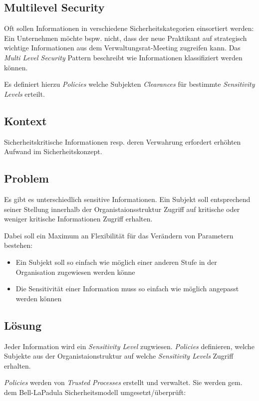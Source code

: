 \subsection{Multilevel Security}

Oft sollen Informationen in verschiedene Sicherheitskategorien einsortiert werden: Ein Unternehmen möchte bspw. nicht, dass der neue Praktikant auf strategisch wichtige Informationen aus dem Verwaltungsrat-Meeting zugreifen kann. Das \emph{Multi Level Security} Pattern beschreibt wie Informationen klassifiziert werden können.

Es definiert hierzu \emph{Policies} welche Subjekten \emph{Clearances} für bestimmte \emph{Sensitivity Levels} erteilt.


\subsection*{Kontext}
Sicherheitskritische Informationen resp. deren Verwahrung erfordert erhöhten Aufwand im Sicherheitskonzept.

\subsection*{Problem}
Es gibt es unterschiedlich sensitive Informationen. Ein Subjekt soll entsprechend seiner Stellung innerhalb der Organistaionsstruktur Zugriff auf kritische oder weniger kritische Informationen Zugriff erhalten.

Dabei soll ein Maximum an Flexibilität für das Verändern von Parametern bestehen:
\begin{itemize}
	\item Ein Subjekt soll so einfach wie möglich einer anderen Stufe in der Organisation zugewiesen werden könne
	\item Die Sensitivität einer Information muss so einfach wie möglich angepasst werden können
\end{itemize}

\subsection*{Lösung}
Jeder Information wird ein \emph{Sensitivity Level} zugwiesen. \emph{Policies} definieren, welche Subjekte aus der Organistaionstruktur auf welche \emph{Sensitivity Levels} Zugriff erhalten.

\emph{Policies} werden von \emph{Trusted Processes} erstellt und verwaltet. Sie werden gem. dem Bell-LaPadula Sicherheitsmodell\cite{BellLaPadula} umgesetzt/überprüft:

